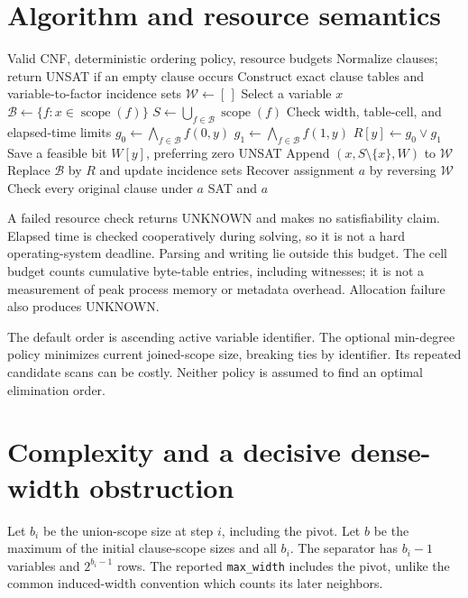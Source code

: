 \documentclass[11pt]{article}
\newcommand{\B}{\{0,1\}}
\newcommand{\scope}{\operatorname{scope}}
\begin{document}
\section{Algorithm and resource semantics}
\begin{algorithm}[ht]
\caption{Dense bucket elimination with reverse witness tables}
\begin{algorithmic}[1]
\Require Valid CNF, deterministic ordering policy, resource budgets
\State Normalize clauses; return UNSAT if an empty clause occurs
\State Construct exact clause tables and variable-to-factor incidence sets
\State $\mathcal W\gets[\,]$
 \State Select a variable $x$
 \State $\mathcal B\gets\{f:x\in\scope(f)\}$
 \State $S\gets\bigcup_{f\in\mathcal B}\scope(f)$
 \State Check width, table-cell, and elapsed-time limits
 \ForAll{$y\in\B^{S\setminus\{x\}}$}
  \State $g_0\gets\bigwedge_{f\in\mathcal B}f(0,y)$
  \State $g_1\gets\bigwedge_{f\in\mathcal B}f(1,y)$
  \State $R[y]\gets g_0\lor g_1$
  \State Save a feasible bit $W[y]$, preferring zero
 \EndFor
  \State \Return UNSAT
 \EndIf
 \State Append $(x,S\setminus\{x\},W)$ to $\mathcal W$
 \State Replace $\mathcal B$ by $R$ and update incidence sets
\EndWhile
\State Recover assignment $a$ by reversing $\mathcal W$
\State Check every original clause under $a$
\State \Return SAT and $a$
\end{algorithmic}
\end{algorithm}

A failed resource check returns UNKNOWN and makes no satisfiability claim.
Elapsed time is checked cooperatively during solving, so it is not a hard
operating-system deadline. Parsing and writing lie outside this budget.
The cell budget counts cumulative byte-table entries, including witnesses;
it is not a measurement of peak process memory or metadata overhead.
Allocation failure also produces UNKNOWN.

The default order is ascending active variable identifier.
The optional min-degree policy minimizes current joined-scope size,
breaking ties by identifier. Its repeated candidate scans can be costly.
Neither policy is assumed to find an optimal elimination order.

\section{Complexity and a decisive dense-width obstruction}
Let $b_i$ be the union-scope size at step $i$, including the pivot.
Let $b$ be the maximum of the initial clause-scope sizes and all $b_i$.
The separator has $b_i-1$ variables and $2^{b_i-1}$ rows.
The reported \texttt{max\_width} includes the pivot, unlike the common
induced-width convention which counts its later neighbors.
\end{document}
